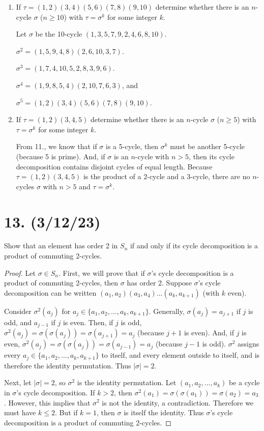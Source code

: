 \documentclass{article}
\begin{document}
\begin{enumerate}[label=(\alph*)]
    \item If $\tau = (1, 2)(3, 4)(5, 6)(7, 8)(9, 10)$ determine whether there is an $n$-cycle $\sigma$ ($n \geq 10$) with $\tau = \sigma^k$ for some integer $k$.

          Let $\sigma$ be the 10-cycle $(1, 3, 5, 7, 9, 2, 4, 6, 8, 10)$.

          $\sigma^2 = (1, 5, 9, 4, 8)(2, 6, 10, 3, 7)$.

          $\sigma^3 = (1, 7, 4, 10, 5, 2, 8, 3, 9, 6)$.

          $\sigma^4 = (1, 9, 8, 5, 4)(2, 10, 7, 6, 3)$, and

          $\sigma^5 = (1, 2)(3, 4)(5, 6)(7, 8)(9, 10)$.
    \item If $\tau = (1, 2)(3, 4, 5)$ determine whether there is an $n$-cycle $\sigma$ ($n \geq 5$) with $\tau = \sigma^k$ for some integer $k$.

          From 11., we know that if $\sigma$ is a 5-cycle, then $\sigma^k$ must be another 5-cycle (because 5 is prime). And, if $\sigma$ is an $n$-cycle with $n > 5$, then its cycle decomposition contains disjoint cycles of equal length. Because $\tau = (1, 2)(3, 4, 5)$ is the product of a 2-cycle and a 3-cycle, there are no $n$-cycles $\sigma$ with $n > 5$ and $\tau = \sigma^k$.
\end{enumerate}

\section*{13. (3/12/23)}

Show that an element has order 2 in $S_n$ if and only if its cycle decomposition is a product of commuting 2-cycles.

\begin{proof}
    Let $\sigma \in S_n$. First, we will prove that if $\sigma$'s cycle decomposition is a product of commuting 2-cycles, then $\sigma$ has order 2. Suppose $\sigma$'s cycle decomposition can be written $(a_1, a_2)(a_3, a_4)...(a_k, a_{k + 1})$ (with $k$ even). 
    
    Consider $\sigma^2(a_j)$ for $a_j \in \{a_1, a_2, ..., a_k, a_{k + 1}\}$. Generally, $\sigma(a_j) = a_{j + 1}$ if $j$ is odd, and $a_{j - 1}$ if $j$ is even. Then, if $j$ is odd, $\sigma^2(a_j) = \sigma(\sigma(a_j)) = \sigma(a_{j + 1}) = a_j$ (because $j + 1$ is even). And, if $j$ is even, $\sigma^2(a_j) = \sigma(\sigma(a_j)) = \sigma(a_{j - 1}) = a_j$ (because $j - 1$ is odd). $\sigma^2$ assigns every $a_j \in \{a_1, a_2, ..., a_k, a_{k + 1}\}$ to itself, and every element outside to itself, and is therefore the identity permutation. Thus $|\sigma| = 2$.

    Next, let $|\sigma| = 2$, so $\sigma^2$ is the identity permutation. Let $(a_1, a_2, ..., a_k)$ be a cycle in $\sigma$'s cycle decomposition. If $k > 2$, then $\sigma^2(a_1) = \sigma(\sigma(a_1)) = \sigma(a_2) = a_3$. However, this implies that $\sigma^2$ is not the identity, a contradiction. Therefore we must have $k \leq 2$. But if $k = 1$, then $\sigma$ is itself the identity. Thus $\sigma$'s cycle decomposition is a product of commuting 2-cycles.
\end{proof}
\end{document}
